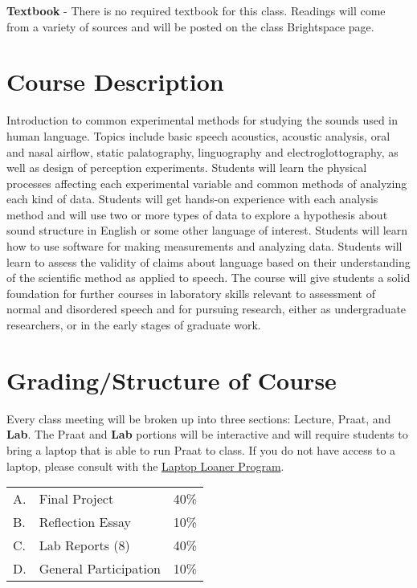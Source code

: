\documentclass[11pt]{article}
\begin{document}
\textbf{Textbook} - There is no required textbook for this class. Readings will come from a variety of sources and will be posted on the class Brightspace page.



\section*{Course Description}

Introduction to common experimental methods for studying the sounds used in human language. Topics include basic speech acoustics, acoustic analysis, oral and nasal airflow, static palatography, linguography and electroglottography, as well as design of perception experiments. Students will learn the physical processes affecting each experimental variable and common methods of analyzing each kind of data. Students will get hands-on experience with each analysis method and will use two or more types of data to explore a hypothesis about sound structure in English or some other language of interest. Students will learn how to use software for making measurements and analyzing data. Students will learn to assess the validity of claims about language based on their understanding of the scientific method as applied to speech. The course will give students a solid foundation for further courses in laboratory skills relevant to assessment of normal and disordered speech and for pursuing research, either as undergraduate researchers, or in the early stages of graduate work.

\section*{Grading/Structure of Course}

Every class meeting will be broken up into three sections: {\color{red}Lecture}, {\color{blue}Praat}, and \textbf{Lab}. 
The {\color{blue}Praat} and \textbf{Lab} portions will be interactive and will require students to bring a laptop that is able to run Praat to class. 
If you do not have access to a laptop, please consult with the \href{https://it.stonybrook.edu/services/student-laptop-loaner-program}{Laptop Loaner Program}.

\begin{center}
\begin{tabular}{l l l}
	\hline
	A. & Final Project & 40\% \\
	B. & Reflection Essay & 10\% \\
	C. & Lab Reports (8) & 40\% \\
	D. & General Participation & 10\%  \\
	\hline
\end{tabular}
\end{center}
\end{document}
